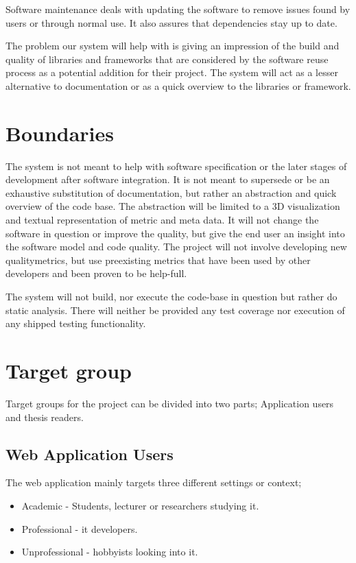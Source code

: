 Software maintenance deals with updating the software to remove issues found by users or through normal use. It also assures that dependencies stay up to date.

The problem our system will help with is giving an impression of the build and quality of libraries and frameworks that are considered by the software reuse process as a potential addition for their project. The system will act as a lesser alternative to documentation or as a quick overview to the libraries or framework.

\section{Boundaries}
The system is not meant to help with software specification or the later stages of development after software integration. It is not meant to supersede or be an exhaustive substitution of documentation, but rather an abstraction and quick overview of the code base. The abstraction will be limited to a 3D visualization and textual representation of metric and meta data. It will not change the software in question or improve the quality, but give the end user an insight into the software model and code quality. 
The project will not involve developing new \glspl{qualitymetric}, but use preexisting metrics that have been used by other developers and been proven to be help-full.

The system will not build, nor execute the code-base in question but rather do static analysis. There will neither be provided any test coverage nor execution of any shipped testing functionality.

\section{Target group}
Target groups for the project can be divided into two parts; Application users and thesis readers.

\subsection{Web Application Users}
The web application mainly targets three different settings or context;
\begin{itemize}
    \item Academic - Students, lecturer or researchers studying \gls{it}. 
    \item Professional - \gls{it} developers.
    \item Unprofessional - hobbyists looking into \gls{it}.
\end{itemize}

